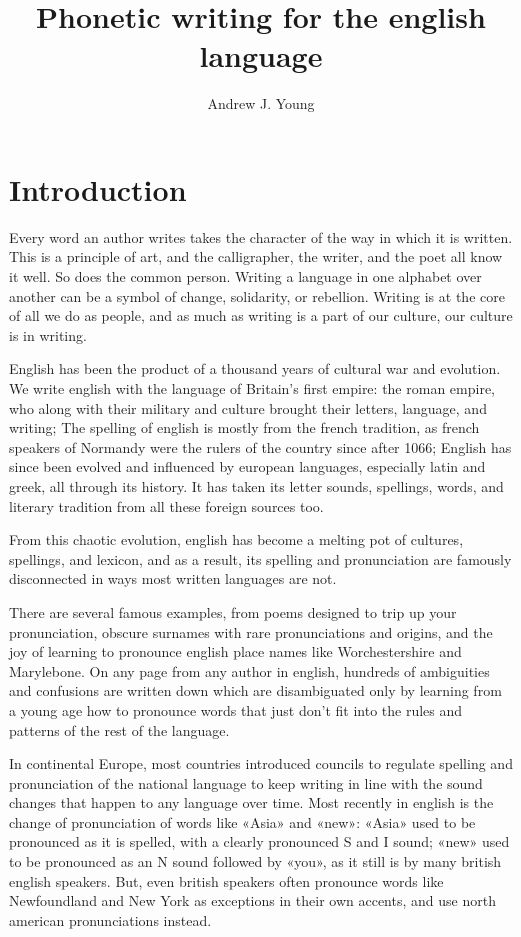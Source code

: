 \documentclass{article}
\title{Phonetic writing for the english language}
\author{Andrew J. Young}
\begin{document}
\maketitle

\begin{abstract}
\end{abstract}

\section{Introduction}

Every word an author writes takes the character of the way in which it is
written. This is a principle of art, and the calligrapher, the writer, and the
poet all know it well. So does the common person. Writing a language in one
alphabet over another can be a symbol of change, solidarity, or rebellion.
Writing is at the core of all we do as people, and as much as writing is a part
of our culture, our culture is in writing.

English has been the product of a thousand years of cultural war and evolution.
We write english with the language of Britain's first empire: the roman
empire, who along with their military and culture brought their letters,
language, and writing; The spelling of english is mostly from the french
tradition, as french speakers of Normandy were the rulers of the country since
after 1066; English has since been evolved and influenced by european languages,
especially latin and greek, all through its history. It has taken its letter
sounds, spellings, words, and literary tradition from all these foreign sources
too.

From this chaotic evolution, english has become a melting pot of cultures,
spellings, and lexicon, and as a result, its spelling and pronunciation are
famously disconnected in ways most written languages are not.

There are several famous examples, from poems designed to trip up your
pronunciation, obscure surnames with rare pronunciations and origins, and the
joy of learning to pronounce english place names like Worchestershire and
Marylebone. On any page from any author in english, hundreds of ambiguities and
confusions are written down which are disambiguated only by learning from a
young age how to pronounce words that just don't fit into the rules and patterns
of the rest of the language.

In continental Europe, most countries introduced councils to regulate spelling
and pronunciation of the national language to keep writing in line with the
sound changes that happen to any language over time. Most recently in english is
the change of pronunciation of words like «Asia» and «new»: «Asia» used to be
pronounced as it is spelled, with a clearly pronounced S and I sound; «new» used
to be pronounced as an N sound followed by «you», as it still is by many british
english speakers. But, even british speakers often pronounce words like
Newfoundland and New York as exceptions in their own accents, and use north
american pronunciations instead.
\end{document}
